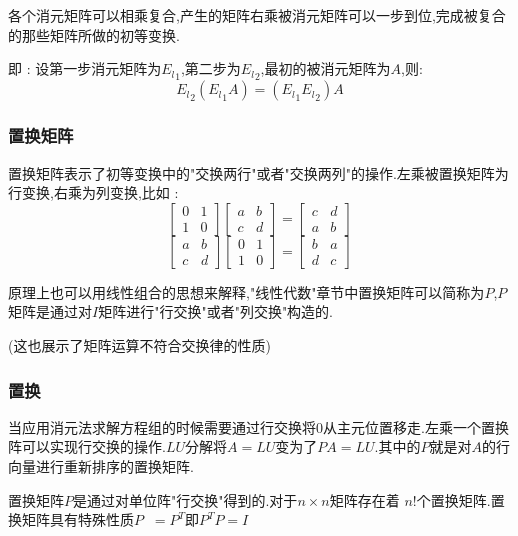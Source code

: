 \documentclass[UTF8,12pt]{ctexbook}
\newcommand{\transpose}{^T}
\DeclareMathOperator{\inverse}{^{-1}}
\begin{document}
{{{{{各个消元矩阵可以相乘复合,产生的矩阵右乘被消元矩阵可以一步到位,完成被复合的那些矩阵所做的初等变换.

即 : 设第一步消元矩阵为${E_l}_1$,第二步为${E_l}_2$,最初的被消元矩阵为$A$,则:
$$
  {E_l}_2({E_l}_1 A) = ({E_l}_1 {E_l}_2)A
$$
}%

\subsubsection{置换矩阵}{
  置换矩阵表示了初等变换中的"交换两行"或者"交换两列"的操作.左乘被置换矩阵为行变换,右乘为列变换,比如 :
  $$
    \begin{bmatrix}
      0 & 1 \\
      1 & 0
    \end{bmatrix}
    \begin{bmatrix}
      a & b \\
      c & d
    \end{bmatrix}
    =
    \begin{bmatrix}
      c & d \\
      a & b
    \end{bmatrix}
  $$
  $$
    \begin{bmatrix}
      a & b \\
      c & d
    \end{bmatrix}
    \begin{bmatrix}
      0 & 1 \\
      1 & 0
    \end{bmatrix}
    =
    \begin{bmatrix}
      b & a \\
      d & c
    \end{bmatrix}
  $$

  原理上也可以用线性组合的思想来解释,"线性代数"章节中置换矩阵可以简称为$P$,$P$矩阵是通过对$I$矩阵进行"行交换"或者"列交换"构造的.

  (这也展示了矩阵运算不符合交换律的性质)
}%

\subsubsection{置换}{
  当应用消元法求解方程组的时候需要通过行交换将$0$从主元位置移走.左乘一个置换阵可以实现行交换的操作.$LU$分解将$A = LU$变为了$PA = LU$.其中的$P$就是对$A$的行向量进行重新排序的置换矩阵.

  置换矩阵$P$是通过对单位阵"行交换"得到的.对于$n \times n$矩阵存在着 $n!$个置换矩阵.置换矩阵具有特殊性质$P\inverse = P\transpose$即$P\transpose P = I$
}%

}}}}
\end{document}
